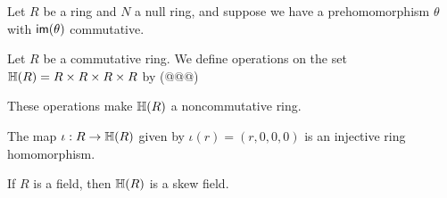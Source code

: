 \begin{exercise}
Let \(R\) be a ring and \(N\) a null ring, and suppose we have a prehomomorphism \(\theta\) with \( \mathsf{im}(\theta) \) commutative.
\end{exercise}

\begin{exercise}
Let \(R\) be a commutative ring. We define operations on the set \(\mathbb{H}(R) = R \times R \times R \times R\) by (@@@)
\begin{proplist}
\item These operations make \(\mathbb{H}(R)\) a noncommutative ring.
\item The map \(\iota : R \rightarrow \mathbb{H}(R)\) given by \(\iota(r) = (r,0,0,0)\) is an injective ring homomorphism.
\item If \(R\) is a field, then \(\mathbb{H}(R)\) is a skew field.
\end{proplist}
\end{exercise}
